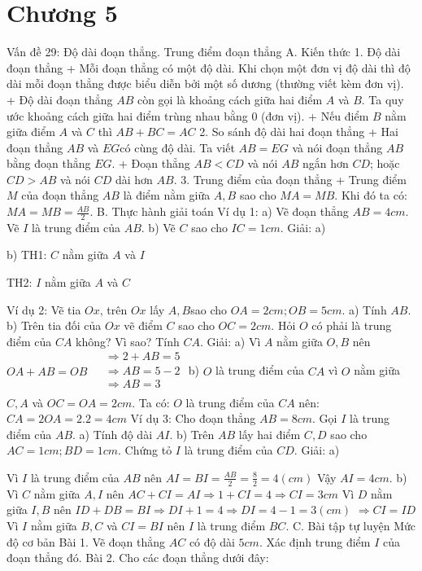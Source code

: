 \def\i{\item}
\graphicspath{{../pictures/vande28/}}
\chapter{Chương 5}
Vấn đề 29: Độ dài đoạn thẳng. Trung điểm đoạn thẳng
A. Kiến thức
1. Độ dài đoạn thẳng
+ Mỗi đoạn thẳng có một độ dài. Khi chọn một đơn vị độ dài thì độ dài mỗi đoạn thẳng được biểu diễn bởi một số dương (thường viết kèm đơn vị).
+ Độ dài đoạn thẳng $AB$ còn gọi là khoảng cách giữa hai điểm $A$ và $B$. Ta quy ước khoảng cách giữa hai điểm trùng nhau bằng 0 (đơn vị).
+ Nếu điểm $B$ nằm giữa điểm $A$ và $C$ thì $AB+BC=AC$
2. So sánh độ dài hai đoạn thẳng
+ Hai đoạn thẳng $AB$ và $EG$có cùng độ dài. Ta viết $AB=EG$ và nói đoạn thẳng $AB$ bằng đoạn thẳng $EG$.
+ Đoạn thẳng $AB<CD$ và nói $AB$ ngắn hơn $CD$; hoặc $CD>AB$ và nói $CD$ dài hơn $AB$.
3. Trung điểm của đoạn thẳng
+ Trung điểm $M$ của đoạn thẳng $AB$ là điểm nằm giữa $A,B$ sao cho $MA=MB$. Khi đó ta có: $MA=MB=\frac{AB}{2}$.
B. Thực hành giải toán
Ví dụ 1:
a) Vẽ đoạn thẳng $AB=4cm$. Vẽ $I$ là trung điểm của $AB$.
b) Vẽ $C$ sao cho $IC=1cm$.
Giải:
a) 

b) TH1: $C$ nằm giữa $A$ và $I$


TH2: $I$ nằm giữa $A$ và $C$

Ví dụ 2: Vẽ tia $Ox$, trên $Ox$ lấy $A,B$sao cho $OA=2cm;OB=5cm$.
a) Tính $AB$.
b) Trên tia đối của $Ox$ vẽ điểm $C$ sao cho $OC=2cm$. Hỏi $O$ có phải là trung điểm của $CA$ không? Vì sao? Tính $CA$.
Giải:
a) 
Vì $A$ nằm giữa $O,B$ nên $OA+AB=OB$
$\begin{align}
	& \Rightarrow 2+AB=5 \\ 
	& \Rightarrow AB=5-2 \\ 
	& \Rightarrow AB=3 \\ 
\end{align}$
b) $O$ là trung điểm của $CA$ vì $O$ nằm giữa $C,A$ và $OC=OA=2cm$.
Ta có: $O$ là trung điểm của $CA$ nên: $CA=2OA=2.2=4cm$
Ví dụ 3: Cho đoạn thẳng $AB=8cm$. Gọi $I$ là trung điểm của $AB$.
a) Tính độ dài $AI$.
b) Trên $AB$ lấy hai điểm $C,D$ sao cho $AC=1cm;BD=1cm$. Chứng tỏ $I$ là trung điểm của $CD$.
Giải:
a) 

Vì $I$ là trung điểm của $AB$ nên $AI=BI=\frac{AB}{2}=\frac{8}{2}=4\left( cm \right)$
Vậy $AI=4cm$.
b) Vì $C$ nằm giữa $A,I$ nên $AC+CI=AI\Rightarrow 1+CI=4\Rightarrow CI=3cm$
Vì $D$ nằm giữa $I,B$ nên $ID+DB=BI\Rightarrow DI+1=4\Rightarrow DI=4-1=3\left( cm \right)$
$\Rightarrow CI=ID$
Vì $I$ nằm giữa $B,C$ và $CI=BI$ nên $I$ là trung điểm $BC$.
C. Bài tập tự luyện
Mức độ cơ bản
Bài 1. Vẽ đoạn thẳng $AC$ có độ dài $5cm$. Xác định trung điểm $I$ của đoạn thẳng đó.
Bài 2. Cho các đoạn thẳng dưới đây:





